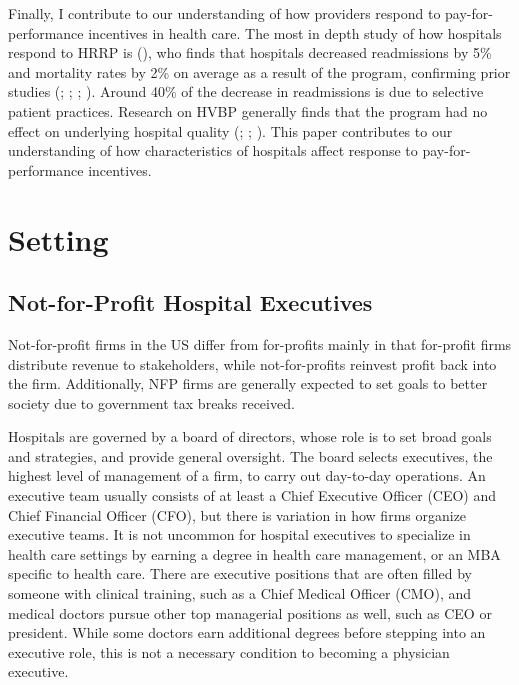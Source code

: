 \documentclass[12pt]{article}
\begin{document}
    Finally, I contribute to our understanding of how providers respond to pay-for-performance incentives in health care. The most in depth study of how hospitals respond to HRRP is \citeauthor{gupta2021impacts} (\citeyear{gupta2021impacts}), who finds that hospitals decreased readmissions by 5\% and mortality rates by 2\% on average as a result of the program, confirming prior studies (\cite{mellor2017does}; \cite{ziedan2018essays}; \cite{ody2019decreases}; \cite{gupta2021impacts}). Around 40\% of the decrease in readmissions is due to selective patient practices. Research on HVBP generally finds that the program had no effect on underlying hospital quality (\cite{us2015hospital}; \cite{norton2018moneyball}; \cite{friedson2019so}). This paper contributes to our understanding of how characteristics of hospitals affect response to pay-for-performance incentives. 

    

    \section{Setting}

    \subsection{Not-for-Profit Hospital Executives}

    Not-for-profit firms in the US differ from for-profits mainly in that for-profit firms distribute revenue to stakeholders, while not-for-profits reinvest profit back into the firm. Additionally, NFP firms are generally expected to set goals to better society due to government tax breaks received.
    
    Hospitals are governed by a board of directors, whose role is to set broad goals and strategies, and provide general oversight. The board selects executives, the highest level of management of a firm, to carry out day-to-day operations. An executive team usually consists of at least a Chief Executive Officer (CEO) and Chief Financial Officer (CFO), but there is variation in how firms organize executive teams. It is not uncommon for hospital executives to specialize in health care settings by earning a degree in health care management, or an MBA specific to health care. There are executive positions that are often filled by someone with clinical training, such as a Chief Medical Officer (CMO), and medical doctors pursue other top managerial positions as well, such as CEO or president. While some doctors earn additional degrees before stepping into an executive role, this is not a necessary condition to becoming a physician executive. 
\end{document}
